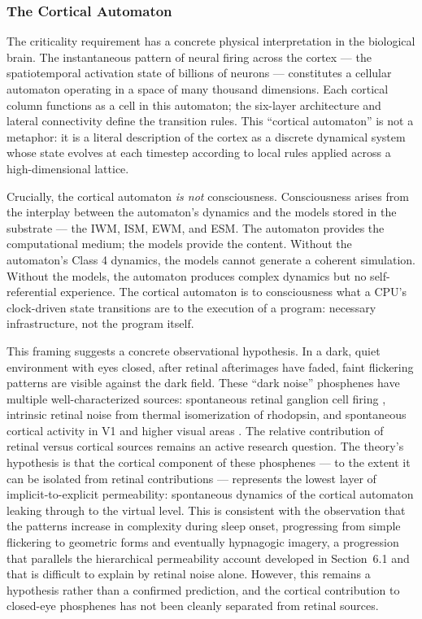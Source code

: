 \documentclass[12pt]{article}
\begin{document}
\subsubsection{The Cortical Automaton}

The criticality requirement has a concrete physical interpretation in the biological brain. The instantaneous pattern of neural firing across the cortex --- the spatiotemporal activation state of billions of neurons --- constitutes a cellular automaton operating in a space of many thousand dimensions. Each cortical column functions as a cell in this automaton; the six-layer architecture and lateral connectivity define the transition rules. This ``cortical automaton'' is not a metaphor: it is a literal description of the cortex as a discrete dynamical system whose state evolves at each timestep according to local rules applied across a high-dimensional lattice.

Crucially, the cortical automaton \emph{is not} consciousness. Consciousness arises from the interplay between the automaton's dynamics and the models stored in the substrate --- the IWM, ISM, EWM, and ESM. The automaton provides the computational medium; the models provide the content. Without the automaton's Class 4 dynamics, the models cannot generate a coherent simulation. Without the models, the automaton produces complex dynamics but no self-referential experience. The cortical automaton is to consciousness what a CPU's clock-driven state transitions are to the execution of a program: necessary infrastructure, not the program itself.

This framing suggests a concrete observational hypothesis. In a dark, quiet environment with eyes closed, after retinal afterimages have faded, faint flickering patterns are visible against the dark field. These ``dark noise'' phosphenes have multiple well-characterized sources: spontaneous retinal ganglion cell firing \citep{BaylorLambYau1979}, intrinsic retinal noise from thermal isomerization of rhodopsin, and spontaneous cortical activity in V1 and higher visual areas \citep{HeitmannBhatt2022}. The relative contribution of retinal versus cortical sources remains an active research question. The theory's hypothesis is that the cortical component of these phosphenes --- to the extent it can be isolated from retinal contributions --- represents the lowest layer of implicit-to-explicit permeability: spontaneous dynamics of the cortical automaton leaking through to the virtual level. This is consistent with the observation that the patterns increase in complexity during sleep onset, progressing from simple flickering to geometric forms and eventually hypnagogic imagery, a progression that parallels the hierarchical permeability account developed in Section~6.1 and that is difficult to explain by retinal noise alone. However, this remains a hypothesis rather than a confirmed prediction, and the cortical contribution to closed-eye phosphenes has not been cleanly separated from retinal sources.
\end{document}
